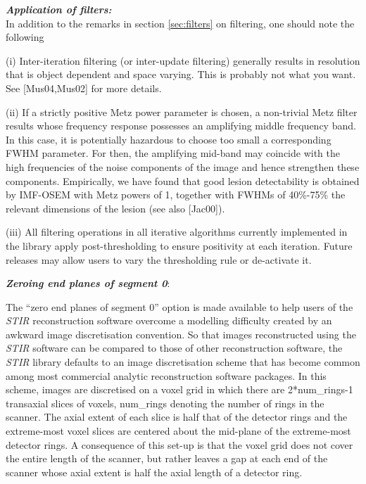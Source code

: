 \documentclass{article}
\begin{document}
{
}
\label{sec:OSMAPOSLtechnotes}

\textbf{\textit{Application of filters:}} \\
In addition to the remarks in section \ref{sec:filters} on filtering, 
one should 
note the following


(i) Inter-iteration filtering (or inter-update filtering) generally 
results in resolution that is object dependent and space varying. 
This is probably not what you want. See [Mus04,Mus02] for more 
details.



(ii) If a strictly positive Metz power parameter is chosen, a 
non-trivial Metz filter results whose frequency response possesses 
an amplifying middle frequency band. In this case, it is potentially 
hazardous to choose too small a corresponding FWHM parameter. 
For then, the amplifying mid-band may coincide with the high 
frequencies of the noise components of the image and hence strengthen 
these components. Empirically, we have found that good lesion 
detectability is obtained by IMF-OSEM with Metz powers of 1, 
together with FWHMs of 40\%-75\% the relevant dimensions of the 
lesion (see also [Jac00]).



(iii) All filtering operations in all iterative algorithms currently 
implemented in the library apply post-thresholding 
to ensure positivity at each iteration. Future 
releases may allow users to vary the thresholding rule or de-activate 
it.


\textbf{\textit{Zeroing end planes of segment 0}}: 


The ``zero end planes of segment 0'' option is made available 
to help users of the \textit{STIR} reconstruction software overcome 
a modelling difficulty created by an awkward image discretisation 
convention. So that images reconstructed using the \textit{STIR} software 
can be compared to those of other reconstruction software, the \textit{STIR} 
library defaults to an image discretisation scheme that has become 
common among most commercial analytic reconstruction software 
packages. In this scheme, images are discretised on a voxel grid 
in which there are 2*num\_rings-1 transaxial slices of voxels, 
num\_rings denoting the number of rings in the scanner. The axial 
extent of each slice is half that of the detector rings and the 
extreme-most voxel slices are centered about the mid-plane of 
the extreme-most detector rings. A consequence of this set-up 
is that the voxel grid does not cover the entire length of the 
scanner, but rather leaves a gap at each end of the scanner whose 
axial extent is half the axial length of a detector ring.
\end{document}

